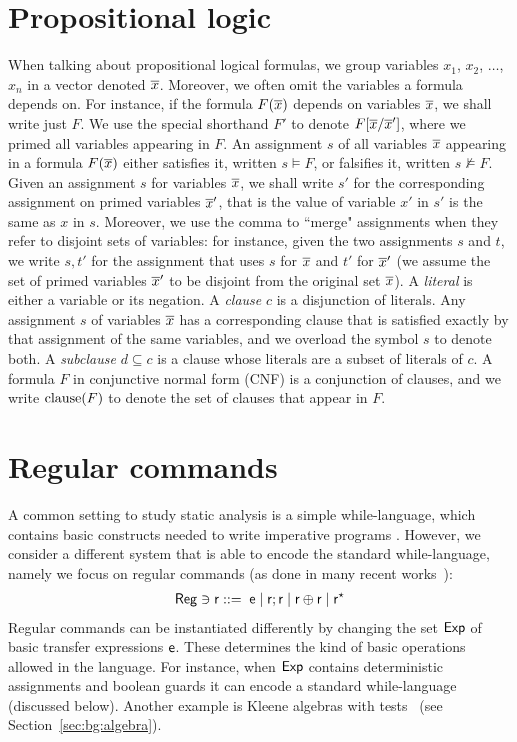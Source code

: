 \section{Propositional logic}
When talking about propositional logical formulas, we group variables $x_1$, $x_2$, $\dots$, $x_n$ in a vector denoted $\overline{x}$. Moreover, we often omit the variables a formula depends on. For instance, if the formula $F(\overline{x})$ depends on variables $\overline{x}$, we shall write just $F$. We use the special shorthand $F'$ to denote $F[\overline{x}/\overline{x}']$, where we primed all variables appearing in $F$.
An assignment $s$ of all variables $\overline{x}$ appearing in a formula $F(\overline{x})$ either satisfies it, written $s \vDash F$, or falsifies it, written $s \nvDash F$. Given an assignment $s$ for variables $\overline{x}$, we shall write $s'$ for the corresponding assignment on primed variables $\overline{x}'$, that is the value of variable $x'$ in $s'$ is the same as $x$ in $s$. Moreover, we use the comma to ``merge" assignments when they refer to disjoint sets of variables: for instance, given the two assignments $s$ and $t$, we write $s, t'$ for the assignment that uses $s$ for $\overline{x}$ and $t'$ for $\overline{x}'$ (we assume the set of primed variables $\overline{x}'$ to be disjoint from the original set $\overline{x}$).
A \emph{literal} is either a variable or its negation. A \emph{clause} $c$ is a disjunction of literals. Any assignment $s$ of variables $\overline{x}$ has a corresponding clause that is satisfied exactly by that assignment of the same variables, and we overload the symbol $s$ to denote both. A \emph{subclause} $d \subseteq c$ is a clause whose literals are a subset of literals of $c$. A formula $F$ in conjunctive normal form (CNF) is a conjunction of clauses, and we write $\text{clause}(F)$ to denote the set of clauses that appear in $F$.

\section{Regular commands}\label{sec:bg:regcomm}
A common setting to study static analysis is a simple while-language, which contains basic constructs needed to write imperative programs \cite{Winskel93}. However, we consider a different system that is able to encode the standard while-language, namely we focus on regular commands (as done in many recent works~\cite{OHearn20,BGGR21,MOH21,RBDDOV20,ZDS23}):
\begin{align}
	\mathsf{Reg}\ni \mathsf{r} ::= \; \mathsf{e}\mid \mathsf{r};\mathsf{r}\mid \mathsf{r} \oplus \mathsf{r} \mid \mathsf{r}^\star \label{eq:bg:regr-def}
\end{align}
Regular commands can be instantiated differently by changing the set $\mathsf{Exp}$ of basic transfer expressions $\mathsf{e}$. These determines the kind of basic operations allowed in the language. For instance, when $\mathsf{Exp}$ contains deterministic assignments and boolean guards it can encode a standard while-language (discussed below). Another example is Kleene algebras with tests~\cite{Kozen97} (see Section~\ref{sec:bg:algebra}).

